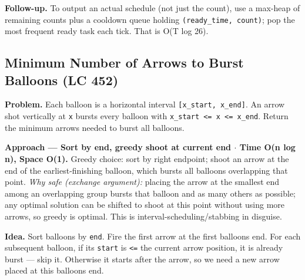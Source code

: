 \documentclass[11pt]{article}
\begin{document}
\textbf{Follow-up.} To output an actual schedule (not just the count), use a max-heap of remaining counts plus a cooldown queue holding \texttt{(ready\_time,\ count)}; pop the most frequent ready task each tick. That is O(T log 26).

\subsection{Minimum Number of Arrows to Burst Balloons (LC 452)}\label{minimum-number-of-arrows-to-burst-balloons-lc-452}

\textbf{Problem.} Each balloon is a horizontal interval \texttt{{[}x\_start,\ x\_end{]}}. An arrow shot vertically at \texttt{x} bursts every balloon with \texttt{x\_start\ \textless{}=\ x\ \textless{}=\ x\_end}. Return the minimum arrows needed to burst all balloons.

\textbf{Approach --- Sort by end, greedy shoot at current end \(\cdot\) Time O(n log n), Space O(1).} Greedy choice: sort by right endpoint; shoot an arrow at the end of the earliest-finishing balloon, which bursts all balloons overlapping that point. \emph{Why safe (exchange argument):} placing the arrow at the smallest end among an overlapping group bursts that balloon and as many others as possible; any optimal solution can be shifted to shoot at this point without using more arrows, so greedy is optimal. This is interval-scheduling/stabbing in disguise.

\textbf{Idea.} Sort balloons by \texttt{end}. Fire the first arrow at the first balloon\textquotesingle s end. For each subsequent balloon, if its \texttt{start} is \texttt{\textless{}=} the current arrow position, it is already burst --- skip it. Otherwise it starts after the arrow, so we need a new arrow placed at this balloon\textquotesingle s end.

\end{document}
